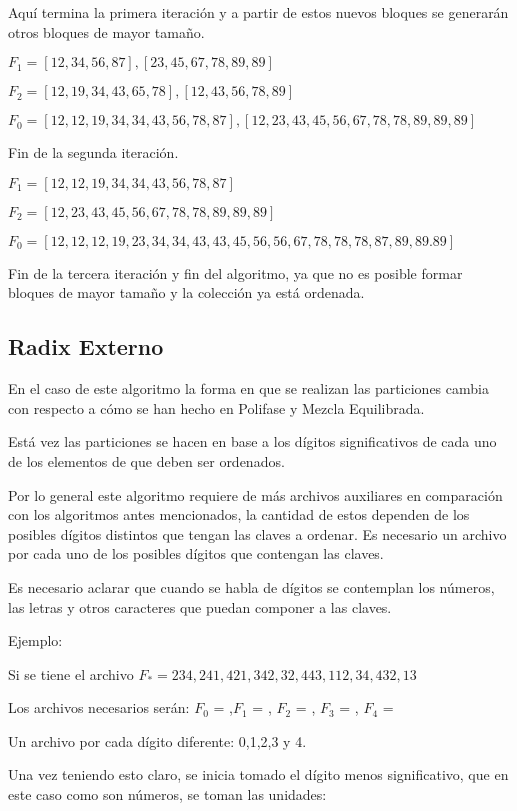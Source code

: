 \documentclass[letterpaper,12pt]{extarticle}
\begin{document}
Aquí termina la primera iteración y a partir de estos nuevos bloques se generarán otros bloques de mayor tamaño.

$F_{1} = {  [ 12,34,56,87 ],  [ 23,45,67,78,89,89 ]}$

$F_{2} = { [ 12,19,34,43,65,78 ],  [ 12,43,56,78,89 ] }$

$F_{0} = { [ 12,12,19,34,34,43,56,78,87 ], [ 12,23,43,45,56,67,78,78,89,89,89 ] }$

Fin de la segunda iteración.

$F_{1} = { [ 12,12,19,34,34,43,56,78,87 ] }$

$F_{2} = { [ 12,23,43,45,56,67,78,78,89,89,89  ] }$

$F_{0} = { [ 12,12,12,19, 23, 34, 34, 43, 43, 45, 56, 56, 67, 78, 78, 78, 87, 89, 89. 89 ] }$

Fin de la tercera iteración y fin del algoritmo, ya que no es posible formar bloques de mayor tamaño y la colección ya está ordenada.


\subsection{Radix Externo}

En el caso de este algoritmo la forma en que se realizan las particiones cambia con respecto a cómo se han hecho en Polifase y Mezcla Equilibrada.

Está vez las particiones se hacen en base a los dígitos significativos de cada uno de los elementos de que deben ser ordenados. 

Por lo general este algoritmo requiere de más archivos auxiliares en comparación con los algoritmos antes mencionados, la cantidad de estos dependen de los posibles dígitos distintos que tengan las claves a ordenar. Es necesario un archivo por cada uno de los posibles dígitos que contengan  las claves.

Es necesario aclarar que cuando se habla de dígitos se contemplan los números, las letras y otros caracteres que puedan componer a las claves.

Ejemplo: 

Si se tiene el archivo $F_{*} = { 234,241,421,342,32,443,112,34,432,13 }$

Los archivos necesarios serán: $F_{0}$ = ,$F_{1}$ = , $F_{2}$ = , $F_{3}$ = , $F_{4}$ =

Un archivo por cada dígito diferente: 0,1,2,3 y 4.

Una vez teniendo esto claro, se inicia tomado el dígito menos significativo, que en este caso como son números, se toman las unidades:
\end{document}
